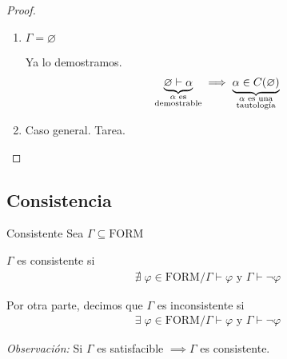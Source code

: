 \begin{proof} \phantom{.}

    \begin{enumerate}[%
                    labelindent=*,
                    style=multiline,
                    leftmargin=*,
                    align=left,
                    leftmargin=2\parindent,
                    label=Caso \arabic*)]
        \item $\Gamma = \varnothing$

            Ya lo demostramos.
            \begin{gather*}
                \underbrace{\varnothing \vdash \alpha}_{%
                \substack{\alpha \text{ es} \\ \text{demostrable}}} 
                \implies \underbrace{\alpha \in C(\varnothing)}_{%
                \substack{\alpha \text{ es una}\\\text{tautología}}}
            \end{gather*}
        
        \item Caso general. Tarea.
    \end{enumerate}
\end{proof}


\subsection{Consistencia}
\begin{definicion}{Consistente}{}
    Sea $\Gamma \subseteq \mathrm{FORM}$

    \medskip

    $\Gamma$ es consistente si 
    \begin{gather*}
        \nexists \; \varphi \in \mathrm{FORM}/
        \Gamma\vdash\varphi \text{ y } \Gamma \vdash \neg \varphi
    \end{gather*}
    
    \medskip

    Por otra parte, decimos que $\Gamma$ es inconsistente si
    \begin{gather*}
        \exists \; \varphi \in \mathrm{FORM} /
        \Gamma \vdash \varphi \text{ y } \Gamma \vdash \neg \varphi
    \end{gather*}
\end{definicion}

\bigskip
\textit{Observación:}
%
Si $\Gamma$ es satisfacible $\implies \Gamma$ es consistente.


